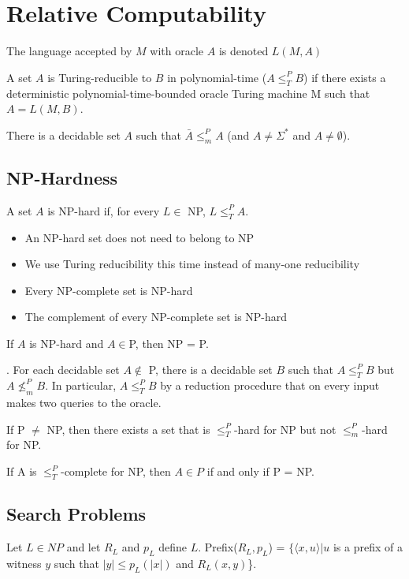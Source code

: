 \section{Relative Computability}

 The language accepted by $M$ with oracle $A$ is denoted $L(M, A)$

 A set $A$ is Turing-reducible to $B$ in polynomial-time 
($A \le_T^P B$) if there exists a deterministic polynomial-time-bounded oracle 
Turing machine M such that $A = L(M, B)$.

 There is a decidable set $A$ such that $\bar{A} \le_m^P A$ (and
$A \ne \Sigma^*$ and $A \ne \emptyset$).

\subsection{NP-Hardness}

 A set $A$ is NP-hard if, for every $L \in$ NP,
$L \le^P_T A$.
\begin{itemize}
  \item An NP-hard set does not need to belong to NP
  \item We use Turing reducibility this time instead of many-one reducibility
  \item Every NP-complete set is NP-hard
  \item The complement of every NP-complete set is NP-hard
\end{itemize}

 If $A$ is NP-hard and $A \in $P, then NP = P.

. For each decidable set $A \notin $ P, there is a
decidable set $B$ such that $A \le^P_T B$ but $A \nleq^P_m B$. In particular, 
$A \le^P_T B$ by a reduction procedure that on every input makes two queries to the oracle.

 If P $\ne$ NP, then there exists a set that is $\le^P_T$-hard 
for NP but not $\le^P_m$-hard for NP.

 If A is $\le^P_T$-complete for NP, then $A \in P$ if and only if P = NP.

\subsection{Search Problems}

 Let $L \in NP$ and let $R_L$ and $p_L$ define $L$.
Prefix($R_L, p_L$) = $\{\langle x, u \rangle | u$ is a prefix of a witness $y$ such that
$|y| \le p_L(|x|)$ and $R_L(x, y)$\}.

